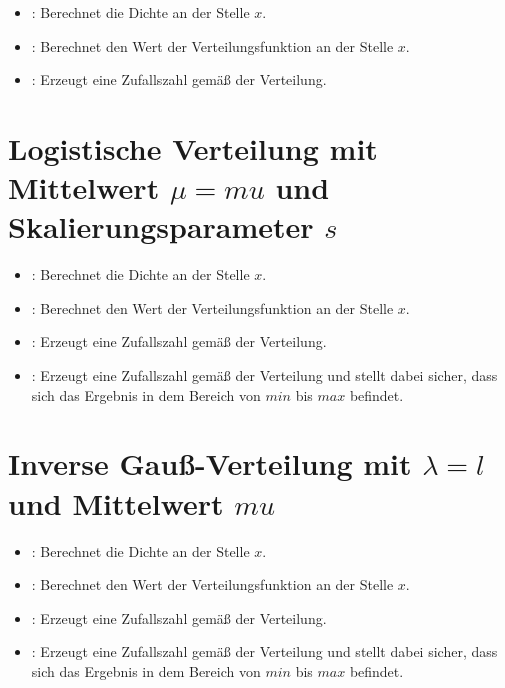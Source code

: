 \begin{itemize}

\item
{}:
Berechnet die Dichte an der Stelle $x$.

\item
{}:
Berechnet den Wert der Verteilungsfunktion an der Stelle $x$.

\item
{}:
Erzeugt eine Zufallszahl gemäß der Verteilung.

\end{itemize}



\section{Logistische Verteilung mit Mittelwert \texorpdfstring{$\mu=mu$}{mu} und Skalierungsparameter \texorpdfstring{$s$}{s}}

\begin{itemize}

\item
{}:
Berechnet die Dichte an der Stelle $x$.

\item
{}:
Berechnet den Wert der Verteilungsfunktion an der Stelle $x$.

\item
{}:
Erzeugt eine Zufallszahl gemäß der Verteilung.

\item
{}:
Erzeugt eine Zufallszahl gemäß der Verteilung und stellt dabei sicher, dass sich das Ergebnis in dem Bereich von $min$ bis $max$ befindet.

\end{itemize}


	
\section{Inverse Gauß-Verteilung mit \texorpdfstring{$\lambda=l$}{l} und Mittelwert \texorpdfstring{$mu$}{mu}}

\begin{itemize}

\item
{}:
Berechnet die Dichte an der Stelle $x$.

\item
{}:
Berechnet den Wert der Verteilungsfunktion an der Stelle $x$.

\item
{}:
Erzeugt eine Zufallszahl gemäß der Verteilung.

\item
{}:
Erzeugt eine Zufallszahl gemäß der Verteilung und stellt dabei sicher, dass sich das Ergebnis in dem Bereich von $min$ bis $max$ befindet.

\end{itemize}



